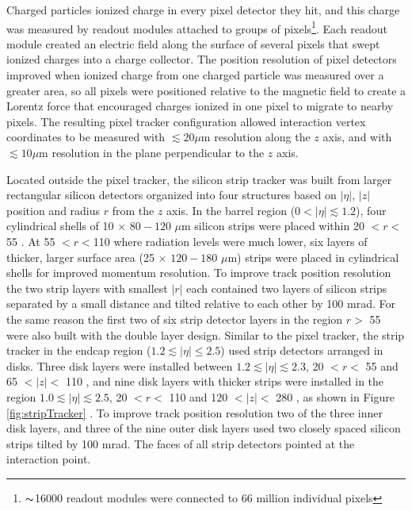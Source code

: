 Charged particles ionized charge in every pixel detector they hit, and this charge was measured by readout 
modules attached to groups of pixels\footnote{$\thicksim$16000 readout modules were connected to 66 million individual pixels}.  Each readout module created an 
electric field along the surface of several pixels that swept ionized charges into a charge collector.  The 
position resolution of pixel detectors improved when ionized charge from one charged particle was measured 
over a greater area, so all pixels were positioned relative to the magnetic field to create a 
Lorentz force that encouraged charges ionized in one pixel to migrate to nearby pixels.  The resulting pixel 
tracker configuration allowed interaction vertex coordinates to be measured with $\lesssim 20\mu$m resolution along the 
$z$ axis, and with $\lesssim 10\mu$m resolution in the plane perpendicular to the $z$ axis.

Located outside the pixel tracker, the silicon strip tracker was built from larger rectangular silicon detectors 
organized into four structures based on $|\eta|$, $|z|$ position and radius $r$ from the $z$ axis.  In the barrel region 
($0 < |\eta| \lesssim 1.2$), four cylindrical shells of 10 \cm $\times$ $80-120$ $\mu$m silicon strips were placed within 20 $< r <$ 55 \cm.  At
55 $< r < $110 \cm where radiation levels were much lower, six layers of thicker, larger surface area (25 \cm $\times$ $120-180$ $\mu$m) 
strips were placed in cylindrical shells for improved momentum resolution.  To improve track position resolution the two strip layers with smallest 
$|r|$ each contained two layers of silicon strips separated by a small distance and tilted relative 
to each other by 100 mrad.  For the same reason the first two of six strip detector layers in the region $r >$ 55 \cm 
were also built with the double layer design.  Similar to the pixel tracker, the strip tracker in the endcap region 
($1.2 \lesssim |\eta| \leq 2.5$) used strip detectors arranged in disks.  Three disk layers were installed between 
$1.2 \lesssim |\eta| \lesssim 2.3$, 20 $< r <$ 55 \cm and 65 $< |z| <$ 110 \cm, and nine disk layers with thicker strips were installed in 
the region $1.0 \lesssim |\eta| \lesssim 2.5$, 20 $< r <$ 110 \cm and 120 $< |z| < $ 280 \cm, as shown in Figure \ref{fig:stripTracker} \cite{cmsTDR}.  
To improve track position resolution two of the three inner disk layers, and three of the nine outer disk layers 
used two closely spaced silicon strips tilted by 100 mrad.  The faces of all strip detectors pointed at the interaction 
point.

